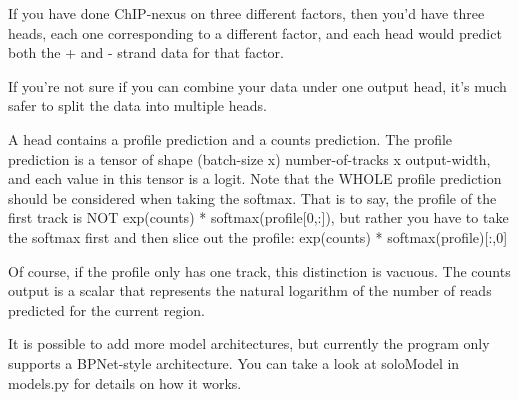 \documentclass{article}
\begin{document}
If you have done ChIP-nexus on three different factors, then you'd have three heads, each one corresponding to a different factor, and each head would predict both the + and - strand data for that factor.

If you're not sure if you can combine your data under one output head, it's much safer to split the data into multiple heads.

A head contains a profile prediction and a counts prediction. The profile prediction is a tensor of shape (batch-size x) number-of-tracks x output-width, and each value in this tensor is a logit.
Note that the WHOLE profile prediction should be considered when taking the softmax.
That is to say, the profile of the first track is NOT exp(counts) * softmax(profile[0,:]), but rather you have to take the softmax first and then slice out the profile: exp(counts) * softmax(profile)[:,0]

Of course, if the profile only has one track, this distinction is vacuous.
The counts output is a scalar that represents the natural logarithm of the number of reads predicted for the current region.

It is possible to add more model architectures, but currently the program only supports a BPNet-style architecture. You can take a look at soloModel in models.py for details on how it works.
\end{document}
